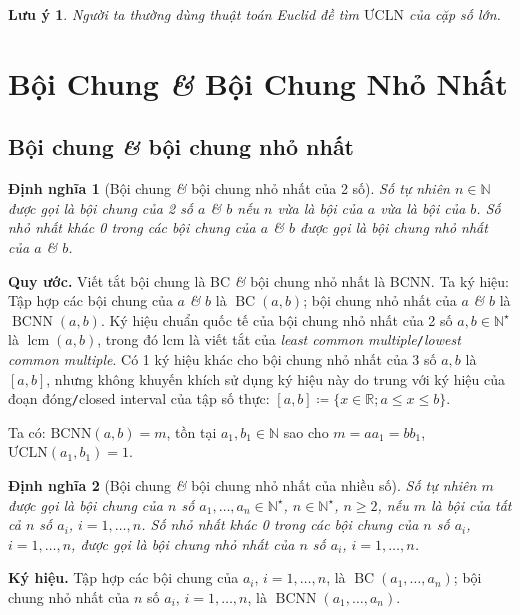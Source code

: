 \documentclass{article}
\numberwithin{equation}{section}
\newtheorem{dinhnghia}{Định nghĩa}[section]
\newtheorem{luuy}{Lưu ý}[section]
\begin{document}
\begin{luuy}
	Người ta thường dùng thuật toán Euclid đề tìm $\mbox{ƯCLN}$ của cặp số lớn.
\end{luuy}


\section{Bội Chung \textit{\&} Bội Chung Nhỏ Nhất}

\subsection{Bội chung \textit{\&} bội chung nhỏ nhất}

\begin{dinhnghia}[Bội chung \textit{\&} bội chung nhỏ nhất của 2 số]
	Số tự nhiên $n\in\mathbb{N}$ được gọi là \emph{bội chung} của 2 số $a$ \textit{\&} $b$ nếu $n$ vừa là bội của $a$ vừa là bội của $b$. Số nhỏ nhất khác 0 trong các bội chung của $a$ \textit{\&} $b$ được gọi là \emph{bội chung nhỏ nhất} của $a$ \textit{\&} $b$.
\end{dinhnghia}
\noindent\textbf{Quy ước.} Viết tắt bội chung là BC \textit{\&} bội chung nhỏ nhất là BCNN. Ta ký hiệu: Tập hợp các bội chung của $a$ \textit{\&} $b$ là $\operatorname{BC}(a,b)$; bội chung nhỏ nhất của $a$ \textit{\&} $b$ là $\operatorname{BCNN}(a,b)$. Ký hiệu chuẩn quốc tế của bội chung nhỏ nhất của 2 số $a,b\in\mathbb{N}^\star$ là $\operatorname{lcm}(a,b)$, trong đó lcm là viết tắt của \textit{least common multiple}\texttt{/}\textit{lowest common multiple}. Có 1 ký hiệu khác cho bội chung nhỏ nhất của 3 số $a,b$ là $[a,b]$, nhưng không khuyến khích sử dụng ký hiệu này do trung với ký hiệu của đoạn đóng\texttt{/}closed interval của tập số thực: $[a,b]\coloneqq\{x\in\mathbb{R};a\le x\le b\}$.

Ta có: $\mbox{BCNN}(a,b) = m$, tồn tại $a_1,b_1\in\mathbb{N}$ sao cho $m = aa_1 = bb_1$, $\mbox{ƯCLN}(a_1,b_1) = 1$.

\begin{dinhnghia}[Bội chung \textit{\&} bội chung nhỏ nhất của nhiều số]
	Số tự nhiên $m$ được gọi là \emph{bội chung} của $n$ số $a_1,\ldots,a_n\in\mathbb{N}^\star$, $n\in\mathbb{N}^\star$, $n\ge 2$, nếu $m$ là bội của tất cả $n$ số $a_i$, $i = 1,\ldots,n$. Số nhỏ nhất khác 0 trong các bội chung của $n$ số $a_i$, $i = 1,\ldots,n$, được gọi là \emph{bội chung nhỏ nhất} của $n$ số $a_i$, $i = 1,\ldots,n$.
\end{dinhnghia}
\noindent\textbf{Ký hiệu.} Tập hợp các bội chung của $a_i$, $i = 1,\ldots,n$, là $\operatorname{BC}(a_1,\ldots,a_n)$; bội chung nhỏ nhất của $n$ số $a_i$, $i = 1,\ldots,n$, là $\operatorname{BCNN}(a_1,\ldots,a_n)$.
\end{document}
